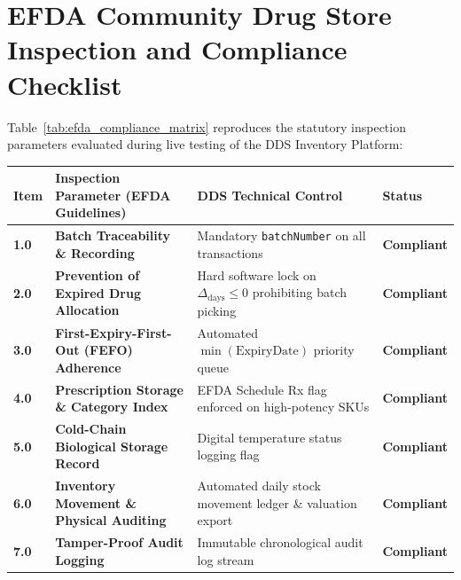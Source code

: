 \chapter{EFDA Community Drug Store Inspection and Compliance Checklist}
\label{app:efda_checklist}

Table~\ref{tab:efda_compliance_matrix} reproduces the statutory inspection parameters evaluated during live testing of the DDS Inventory Platform:

\begin{longtable}{@{}p{}p{}p{}p{}@{}}
\toprule
\textbf{Item} & \textbf{Inspection Parameter (EFDA Guidelines)} & \textbf{DDS Technical Control} & \textbf{Status} \\
\midrule
\endhead
\textbf{1.0} & \textbf{Batch Traceability \& Recording} & Mandatory \texttt{batchNumber} on all transactions & \textbf{Compliant} \\
\textbf{2.0} & \textbf{Prevention of Expired Drug Allocation} & Hard software lock on $\Delta_{\text{days}} \le 0$ prohibiting batch picking & \textbf{Compliant} \\
\textbf{3.0} & \textbf{First-Expiry-First-Out (FEFO) Adherence} & Automated $\min(\text{ExpiryDate})$ priority queue & \textbf{Compliant} \\
\textbf{4.0} & \textbf{Prescription Storage \& Category Index} & EFDA Schedule Rx flag enforced on high-potency SKUs & \textbf{Compliant} \\
\textbf{5.0} & \textbf{Cold-Chain Biological Storage Record} & Digital temperature status logging flag & \textbf{Compliant} \\
\textbf{6.0} & \textbf{Inventory Movement \& Physical Auditing} & Automated daily stock movement ledger \& valuation export & \textbf{Compliant} \\
\textbf{7.0} & \textbf{Tamper-Proof Audit Logging} & Immutable chronological audit log stream & \textbf{Compliant} \\
\bottomrule
\end{longtable}
